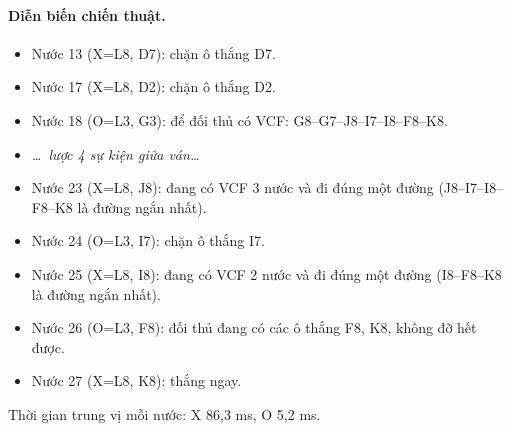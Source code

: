 \paragraph{Diễn biến chiến thuật.}
\begin{itemize}\footnotesize\linespread{1.1}\selectfont
\setlength{\itemsep}{0pt}
  \item Nước 13 (X=L8, D7): chặn ô thắng D7.
  \item Nước 17 (X=L8, D2): chặn ô thắng D2.
  \item Nước 18 (O=L3, G3): để đối thủ có VCF: G8--G7--J8--I7--I8--F8--K8.
  \item[] \emph{\dots\ lược 4 sự kiện giữa ván\dots}
  \item Nước 23 (X=L8, J8): đang có VCF 3 nước và đi đúng một đường (J8--I7--I8--F8--K8 là đường ngắn nhất).
  \item Nước 24 (O=L3, I7): chặn ô thắng I7.
  \item Nước 25 (X=L8, I8): đang có VCF 2 nước và đi đúng một đường (I8--F8--K8 là đường ngắn nhất).
  \item Nước 26 (O=L3, F8): đối thủ đang có các ô thắng F8, K8, không đỡ hết được.
  \item Nước 27 (X=L8, K8): thắng ngay.
\end{itemize}
Thời gian trung vị mỗi nước: X 86,3 ms, O 5,2 ms.
\clearpage

